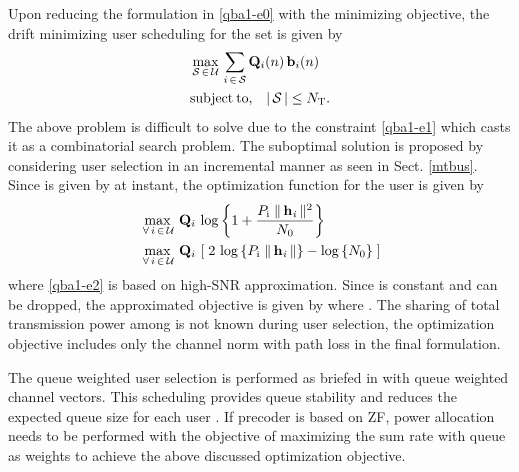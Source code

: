 Upon reducing the formulation in \eqref{qba1-e0} with the minimizing objective, the drift minimizing user scheduling for the set  is given by
\begin{eqnarray}
&\displaystyle \max_{\mathcal{S} \, \in \, \mathcal{U}} \, \sum_{i \, \in \, \mathcal{S}}\mathbf{Q}_i(n) \, \mathbf{b}_i(n) \\
&\displaystyle \mathrm{subject \: to,} \quad | \, \mathcal{S} \, | \leq N_{\mathrm{T}}.
\label{qba1-e1}
\end{eqnarray}
The above problem is difficult to solve due to the constraint \eqref{qba1-e1} which casts it as a combinatorial search problem. The suboptimal solution is proposed by considering user selection in an incremental manner as seen in Sect. \ref{mtbus}. Since  is given by  at  instant, the optimization function for the user  is given by
\begin{eqnarray}
&\displaystyle \max_{\, \forall \, i \, \in \, \mathcal{U}} \, \mathbf{Q}_i \, \log \left \lbrace 1 + \frac{P_{\mathrm{i}} \; \|\, \mathbf{h}_{\mathit{i}} \,\|^2}{N_{\mathrm{0}}} \right \rbrace \\
&\displaystyle \max_{\, \forall \, i \, \in \, \mathcal{U}} \, \mathbf{Q}_i \, \left [ \; 2 \, \log \left \lbrace P_{\mathrm{i}} \; \|\, \mathbf{h}_{\mathit{i}} \,\| \right \rbrace - \log \left \lbrace N_{\mathrm{0}} \right \rbrace \; \right ]
\label{qba1-e2}
\end{eqnarray}
where \eqref{qba1-e2} is based on high-SNR approximation. Since  is constant and can be dropped, the approximated objective is given by  where . The sharing of total transmission power among  is not known during user selection, the optimization objective includes only the channel norm with path loss in the final formulation.

The queue weighted user selection is performed as briefed in \cite{sus2006zfbf,sun2009eigenmode} with queue weighted channel vectors. This scheduling provides queue stability and reduces the expected queue size for each user \cite{neely2012stability}. If precoder is based on ZF, power allocation needs to be performed with the objective of maximizing the sum rate with queue as weights to achieve the above discussed optimization objective.

